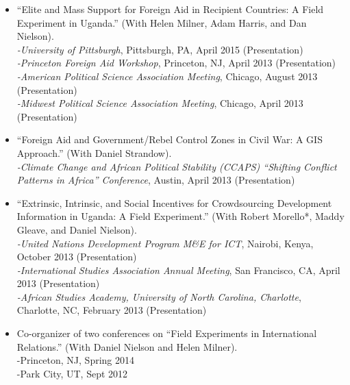 \documentclass[10pt]{article}
\begin{document}
\begin{itemize}

\item ``Elite and Mass Support for Foreign Aid in Recipient Countries: A Field Experiment in Uganda.'' (With Helen Milner, Adam Harris, and Dan Nielson).
	\\ \indent \textit{-University of Pittsburgh}, Pittsburgh, PA, April 2015 (Presentation)
	\\ \indent \textit{-Princeton Foreign Aid Workshop}, Princeton, NJ, April 2013 (Presentation)
	\\ \indent \textit{-American Political Science Association Meeting}, Chicago, August 2013 (Presentation)
	\\ \indent \textit{-Midwest Political Science Association Meeting}, Chicago, April 2013 (Presentation)
	
\item ``Foreign Aid and Government/Rebel Control Zones in Civil War: A GIS Approach.'' (With Daniel Strandow).
	\\ \indent \textit{-Climate Change and African Political Stability (CCAPS) ``Shifting Conflict Patterns in Africa'' Conference}, Austin, April 2013 (Presentation)

\item ``Extrinsic, Intrinsic, and Social Incentives for Crowdsourcing Development Information in Uganda: A Field Experiment.'' (With Robert Morello*, Maddy Gleave, and Daniel Nielson). 
	\\ \indent \textit{-United Nations Development Program M\&E for ICT}, Nairobi, Kenya, October 2013 (Presentation)	
	\\ \indent \textit{-International Studies Association Annual Meeting}, San Francisco, CA, April 2013  (Presentation)
	\\ \indent \textit{-African Studies Academy, University of North Carolina, Charlotte}, Charlotte, NC, February 2013 (Presentation)
	
\item Co-organizer of two conferences on ``Field Experiments in International Relations.'' (With Daniel Nielson and Helen Milner). 
	\\ \indent -Princeton, NJ, Spring 2014  
	\\ \indent -Park City, UT, Sept 2012
	

\end{itemize}
\end{document}
